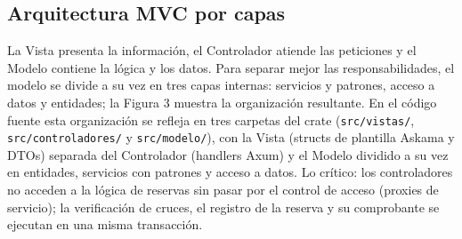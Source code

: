 \documentclass[12pt]{article}
\begin{document}
\subsection{Arquitectura MVC por capas}
La Vista presenta la informaci\'on, el Controlador atiende las peticiones y el Modelo contiene la l\'ogica y los datos. Para separar mejor las responsabilidades, el modelo se divide a su vez en tres capas internas: servicios y patrones, acceso a datos y entidades; la Figura 3 muestra la organizaci{\'o}n resultante. En el c\'odigo fuente esta organizaci\'on se refleja en tres carpetas del crate (\texttt{src/vistas/}, \texttt{src/controladores/} y \texttt{src/modelo/}), con la Vista (structs de plantilla Askama y DTOs) separada del Controlador (handlers Axum) y el Modelo dividido a su vez en entidades, servicios con patrones y acceso a datos. Lo cr\'itico: los controladores no acceden a la l\'ogica de reservas sin pasar por el control de acceso (proxies de servicio); la verificaci\'on de cruces, el registro de la reserva y su comprobante se ejecutan en una misma transacci\'on.
\end{document}
